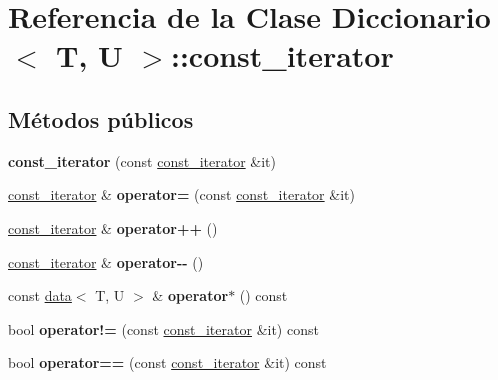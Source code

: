 \hypertarget{classDiccionario_1_1const__iterator}{}\section{Referencia de la Clase Diccionario$<$ T, U $>$\+:\+:const\+\_\+iterator}
\label{classDiccionario_1_1const__iterator}
\subsection*{Métodos públicos}
\begin{DoxyCompactItemize}
\item 
\mbox{\label{classDiccionario_1_1const__iterator_a2ed352598337e8001d988e51b1674f94}} 
{\bfseries const\+\_\+iterator} (const \hyperlink{classDiccionario_1_1const__iterator}{const\+\_\+iterator} \&it)
\item 
\mbox{\label{classDiccionario_1_1const__iterator_af5850f151884fdeaaf9509f61313ea99}} 
\hyperlink{classDiccionario_1_1const__iterator}{const\+\_\+iterator} \& {\bfseries operator=} (const \hyperlink{classDiccionario_1_1const__iterator}{const\+\_\+iterator} \&it)
\item 
\mbox{\label{classDiccionario_1_1const__iterator_adaea80a81bf9003b8a24d86a4242228f}} 
\hyperlink{classDiccionario_1_1const__iterator}{const\+\_\+iterator} \& {\bfseries operator++} ()
\item 
\mbox{\label{classDiccionario_1_1const__iterator_a2df15fadfb78a83b8ef68d87c4f0b205}} 
\hyperlink{classDiccionario_1_1const__iterator}{const\+\_\+iterator} \& {\bfseries operator-\/-\/} ()
\item 
\mbox{\label{classDiccionario_1_1const__iterator_a293fc251c937130305847f8245b46f62}} 
const \hyperlink{structdata}{data}$<$ T, U $>$ \& {\bfseries operator$\ast$} () const
\item 
\mbox{\label{classDiccionario_1_1const__iterator_a777889fc946c8ed7143a3f019c6e3b71}} 
bool {\bfseries operator!=} (const \hyperlink{classDiccionario_1_1const__iterator}{const\+\_\+iterator} \&it) const
\item 
\mbox{\label{classDiccionario_1_1const__iterator_a3a9ec7e9379086f44cec30a96a4ae1d8}} 
bool {\bfseries operator==} (const \hyperlink{classDiccionario_1_1const__iterator}{const\+\_\+iterator} \&it) const
\end{DoxyCompactItemize}
